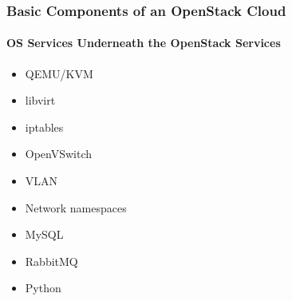 \documentclass[helvetica,english,utf8,notitle,nologo]{beamer}
\begin{document}
\begin{frame}
  \frametitle{Basic Components of an OpenStack Cloud}
  \framesubtitle{OS Services Underneath the OpenStack Services}
  \begin{itemize}
  \item QEMU/KVM
  \item libvirt
  \item iptables
  \item OpenVSwitch
  \item VLAN
  \item Network namespaces
  \item MySQL
  \item RabbitMQ
  \item Python
  \end{itemize}
\end{frame}
\end{document}
